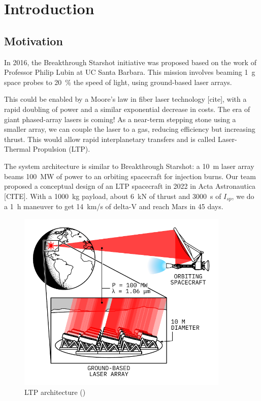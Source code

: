 \chapter{Introduction} \label{chp:intro}
    
    \section{Motivation}

        In 2016, the Breakthrough Starshot initiative was proposed based on the work of Professor Philip Lubin at UC Santa Barbara. This mission involves beaming \qty{1}{g} space probes to \qty{20}{\%} the speed of light, using ground-based laser arrays.

        This could be enabled by a Moore's law in fiber laser technology [cite], with a rapid doubling of power and a similar exponential decrease in costs. The era of giant phased-array lasers is coming! As a near-term stepping stone using a smaller array, we can couple the laser to a gas, reducing efficiency but increasing thrust. This would allow rapid interplanetary transfers and is called Laser-Thermal Propulsion (LTP).

        The system architecture is similar to Breakthrough Starshot: a \qty{10}{m} laser array beams \qty{100}{MW} of power to an orbiting spacecraft for injection burns. Our team proposed a conceptual design of an LTP spacecraft in 2022 in Acta Astronautica [CITE]. With a \qty{1000}{kg} payload, about \qty{6}{kN} of thrust and \qty{3000}{s} of $I_{sp}$, we do a \qty{1}{h} maneuver to get \qty{14}{km/s} of delta-V and reach Mars in 45 days.

        \begin{figure}[!ht]
            \centering
            \includegraphics[width=0.9\textwidth]{assets/2 background/ltp_architecture.pdf}
            \caption{LTP architecture (\textcite{duplayArgonLaserPlasmaThruster2024a})}
            \label{fig:LTP architecture}
        \end{figure}

